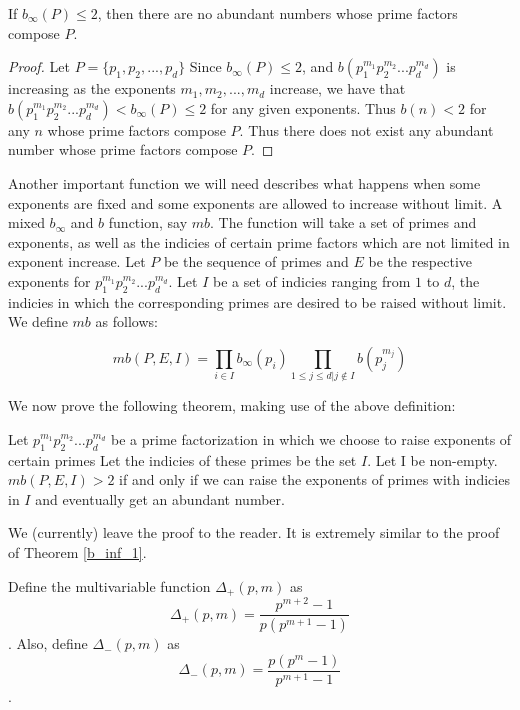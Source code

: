 \documentclass[../paper.tex]{article}
\begin{document}
\begin{theorem}
If $b_{\infty}(P) \leq 2$, then there are no abundant numbers 
whose prime factors compose $P$.
\end{theorem}

\begin{proof}
Let $P = \{p_1, p_2, ..., p_d\}$
Since $b_{\infty}(P) \leq 2$, and $b(p_1^{m_1} p_2^{m_2} ... p_d^{m_d})$
is increasing as the exponents $m_1, m_2, ..., m_d$ increase, we have that
$b(p_1^{m_1} p_2^{m_2} ... p_d^{m_d}) < b_{\infty}(P) \leq 2$ for any 
given exponents. Thus $b(n) < 2$ for any $n$ whose prime factors
compose $P$. Thus there does not exist any abundant number whose 
prime factors compose $P$.

\end{proof}

Another important function we will need describes what happens 
when some exponents are fixed and some exponents are allowed to
increase without limit. A mixed $b_{\infty}$ and $b$ function, 
say $mb$. The function will take a set of primes and exponents,
as well as the indicies of certain prime factors which are not
limited in exponent increase. Let $P$ be the sequence of primes 
and $E$ be the respective exponents for 
$p_1^{m_1} p_2^{m_2} ... p_d^{m_d}$. Let $I$ be a set of indicies
ranging from $1$ to $d$, the indicies in which the corresponding
primes are desired to be raised without limit. We define $mb$ as 
follows:

\begin{equation}\label{mb_def}
  mb(P,E,I) = \prod_{i \in I} b_{\infty}(p_i) 
  \prod_{1 \leq j \leq d | j \notin I} b(p_j^{m_j})
\end{equation}

We now prove the following theorem, making use of the above definition:

\begin{theorem}
Let $p_1^{m_1} p_2^{m_2} ... p_d^{m_d}$ be a prime factorization 
in which we choose to raise exponents of certain primes Let the 
indicies of these primes be the set $I$. Let I be non-empty.
$mb(P,E,I) > 2$ if and only if we can raise the exponents of primes with 
indicies in $I$ and eventually get an abundant number.
\end{theorem}

We (currently) leave the proof to the reader. It is extremely 
similar to the proof of Theorem {\ref{b_inf_1}}.

Define the multivariable function $\Delta_+(p,m)$ as
$$\Delta_+(p,m) = \frac{p^{m+2} - 1}{ p (p^{m + 1} -
1)}$$. 
Also, define $\Delta_-(p,m)$ as 
$$\Delta_-(p,m) = \frac{p(p^{m} - 1)}{ p^{m + 1} - 1}$$.
\end{document}
